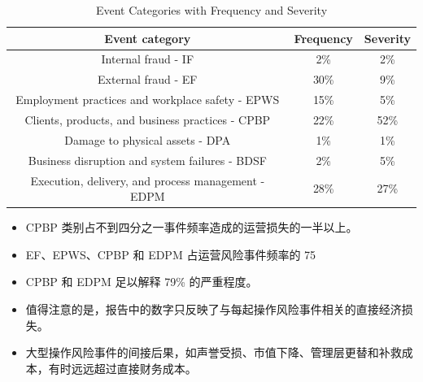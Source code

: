 \begin{table}[h]
    \centering
    \caption{Event Categories with Frequency and Severity}
    \begin{tabular}{@{}>{\raggedright}ccc@{}}
        \toprule
        \textbf{Event category} & \textbf{Frequency} & \textbf{Severity} \\ \midrule
        Internal fraud - IF & 2\% & 2\% \\
        External fraud - EF & 30\% & 9\% \\
        Employment practices and workplace safety - EPWS & 15\% & 5\% \\
        Clients, products, and business practices - CPBP & 22\% & 52\% \\
        Damage to physical assets - DPA & 1\% & 1\% \\
        Business disruption and system failures - BDSF & 2\% & 5\% \\
        Execution, delivery, and process management - EDPM & 28\% & 27\% \\ \bottomrule
    \end{tabular}
\end{table}

\begin{itemize}
\item  CPBP 类别占不到四分之一事件频率造成的运营损失的一半以上。
\item EF、EPWS、CPBP 和 EDPM 占运营风险事件频率的 75%
\item CPBP 和 EDPM 足以解释 79\% 的严重程度。
\item 值得注意的是，报告中的数字只反映了与每起操作风险事件相关的直接经济损失。
\item 大型操作风险事件的间接后果，如声誉受损、市值下降、管理层更替和补救成本，有时远远超过直接财务成本。
\end{itemize}

